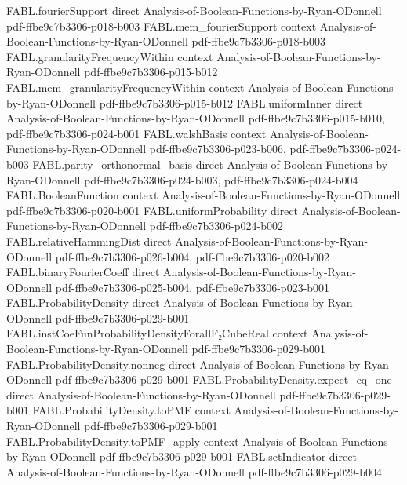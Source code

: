 \begin{theorem}
  {FABL.fourierSupport}
  {direct}
  {Analysis-of-Boolean-Functions-by-Ryan-ODonnell}
  {pdf-ffbe9c7b3306-p018-b003}
\proofstep
  {FABL.mem_fourierSupport}
  {context}
  {Analysis-of-Boolean-Functions-by-Ryan-ODonnell}
  {pdf-ffbe9c7b3306-p018-b003}
\proofstep
  {FABL.granularityFrequencyWithin}
  {context}
  {Analysis-of-Boolean-Functions-by-Ryan-ODonnell}
  {pdf-ffbe9c7b3306-p015-b012}
\proofstep
  {FABL.mem_granularityFrequencyWithin}
  {context}
  {Analysis-of-Boolean-Functions-by-Ryan-ODonnell}
  {pdf-ffbe9c7b3306-p015-b012}
\proofstep
  {FABL.uniformInner}
  {direct}
  {Analysis-of-Boolean-Functions-by-Ryan-ODonnell}
  {pdf-ffbe9c7b3306-p015-b010,
    pdf-ffbe9c7b3306-p024-b001}
\proofstep
  {FABL.walshBasis}
  {context}
  {Analysis-of-Boolean-Functions-by-Ryan-ODonnell}
  {pdf-ffbe9c7b3306-p023-b006,
    pdf-ffbe9c7b3306-p024-b003}
\proofstep
  {FABL.parity_orthonormal_basis}
  {direct}
  {Analysis-of-Boolean-Functions-by-Ryan-ODonnell}
  {pdf-ffbe9c7b3306-p024-b003,
    pdf-ffbe9c7b3306-p024-b004}
\proofstep
  {FABL.BooleanFunction}
  {context}
  {Analysis-of-Boolean-Functions-by-Ryan-ODonnell}
  {pdf-ffbe9c7b3306-p020-b001}
\proofstep
  {FABL.uniformProbability}
  {direct}
  {Analysis-of-Boolean-Functions-by-Ryan-ODonnell}
  {pdf-ffbe9c7b3306-p024-b002}
\proofstep
  {FABL.relativeHammingDist}
  {direct}
  {Analysis-of-Boolean-Functions-by-Ryan-ODonnell}
  {pdf-ffbe9c7b3306-p026-b004,
    pdf-ffbe9c7b3306-p020-b002}
\proofstep
  {FABL.binaryFourierCoeff}
  {direct}
  {Analysis-of-Boolean-Functions-by-Ryan-ODonnell}
  {pdf-ffbe9c7b3306-p025-b004,
    pdf-ffbe9c7b3306-p023-b001}
\proofstep
  {FABL.ProbabilityDensity}
  {direct}
  {Analysis-of-Boolean-Functions-by-Ryan-ODonnell}
  {pdf-ffbe9c7b3306-p029-b001}
\proofstep
  {FABL.instCoeFunProbabilityDensityForallF₂CubeReal}
  {context}
  {Analysis-of-Boolean-Functions-by-Ryan-ODonnell}
  {pdf-ffbe9c7b3306-p029-b001}
\proofstep
  {FABL.ProbabilityDensity.nonneg}
  {direct}
  {Analysis-of-Boolean-Functions-by-Ryan-ODonnell}
  {pdf-ffbe9c7b3306-p029-b001}
\proofstep
  {FABL.ProbabilityDensity.expect_eq_one}
  {direct}
  {Analysis-of-Boolean-Functions-by-Ryan-ODonnell}
  {pdf-ffbe9c7b3306-p029-b001}
\proofstep
  {FABL.ProbabilityDensity.toPMF}
  {context}
  {Analysis-of-Boolean-Functions-by-Ryan-ODonnell}
  {pdf-ffbe9c7b3306-p029-b001}
\proofstep
  {FABL.ProbabilityDensity.toPMF_apply}
  {context}
  {Analysis-of-Boolean-Functions-by-Ryan-ODonnell}
  {pdf-ffbe9c7b3306-p029-b001}
\proofstep
  {FABL.setIndicator}
  {direct}
  {Analysis-of-Boolean-Functions-by-Ryan-ODonnell}
  {pdf-ffbe9c7b3306-p029-b004}
\proofstep

\end{theorem}
